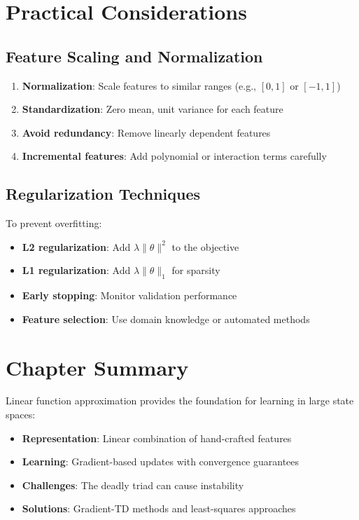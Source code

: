 \section{Practical Considerations}

\subsection{Feature Scaling and Normalization}

\begin{notebox}
\begin{enumerate}
\item \textbf{Normalization}: Scale features to similar ranges (e.g., $[0,1]$ or $[-1,1]$)
\item \textbf{Standardization}: Zero mean, unit variance for each feature
\item \textbf{Avoid redundancy}: Remove linearly dependent features
\item \textbf{Incremental features}: Add polynomial or interaction terms carefully
\end{enumerate}
\end{notebox}

\subsection{Regularization Techniques}

To prevent overfitting:
\begin{itemize}
\item \textbf{L2 regularization}: Add $\lambda \|\theta\|^2$ to the objective
\item \textbf{L1 regularization}: Add $\lambda \|\theta\|_1$ for sparsity
\item \textbf{Early stopping}: Monitor validation performance
\item \textbf{Feature selection}: Use domain knowledge or automated methods
\end{itemize}

\section{Chapter Summary}

Linear function approximation provides the foundation for learning in large state spaces:

\begin{itemize}
\item \textbf{Representation}: Linear combination of hand-crafted features
\item \textbf{Learning}: Gradient-based updates with convergence guarantees
\item \textbf{Challenges}: The deadly triad can cause instability
\item \textbf{Solutions}: Gradient-TD methods and least-squares approaches
\end{itemize}

